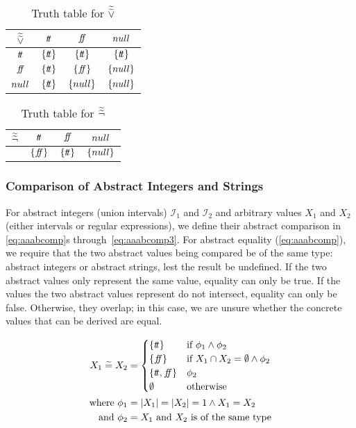 \begin{table}[H]
    \centering
    \caption{Truth table for $\widetilde{\widetilde{\lor}}$}
    \begin{tabular}{c|ccc}
        $\widetilde{\widetilde{\lor}}$ & $t\!t$ & $f\!\!f$ & $null$ \\
        \hline
        $t\!t$ & $\{t\!t\}$ & $\{t\!t\}$ & $\{t\!t\}$ \\
        $f\!\!f$ & $\{t\!t\}$ & $\{f\!\!f\}$ & $\{null\}$ \\
        $null$ & $\{t\!t\}$ & $\{null\}$ & $\{null\}$ \\
    \end{tabular}
    \label{tab:aaablor}
\end{table}

\begin{table}[H]
    \centering
    \caption{Truth table for $\widetilde{\widetilde{\neg}}$}
    \begin{tabular}{c|ccc}
        $\widetilde{\widetilde{\neg}}$ & $t\!t$ & $f\!\!f$ & $null$ \\
        \hline
        & $\{f\!\!f\}$ & $\{t\!t\}$ & $\{null\}$ \\
    \end{tabular}
    \label{tab:aaabneg}
\end{table}

\subsubsection{Comparison of Abstract Integers and Strings}\label{subsubsec:abstract-comparison}
For abstract integers (union intervals) $\mathscr{I}_1$ and $\mathscr{I}_2$ and arbitrary values $X_1$ and $X_2$ (either intervals or regular expressions), we define their abstract comparison in \autoref{eq:aaabcomp}s through~\ref{eq:aaabcomp3}.
For abstract equality (\autoref{eq:aaabcomp}), we require that the two abstract values being compared be of the same type: abstract integers or abstract strings, lest the result be undefined.
If the two abstract values only represent the same value, equality can only be true.
If the values the two abstract values represent do not intersect, equality can only be false.
Otherwise, they overlap; in this case, we are unsure whether the concrete values that can be derived are equal.

\begin{align} \nonumber
    X_1 \;\aab{=}\; X_2 &= \begin{cases}
        \{\true\} & \text{if } \phi_1 \land \phi_2 \\
        \{\false\} & \text{if } X_1 \cap X_2 = \emptyset \land \phi_2 \\
        \{\true, \false\} & \phi_2 \\
        \emptyset & \text{otherwise}
    \end{cases}\\
    \text{where } \phi_1&=|X_1| = |X_2| = 1 \land X_1 = X_2 \nonumber\\
    \text{and } \phi_2&=X_1 \text{ and } X_2 \text{ is of the same type}
    \label{eq:aaabcomp}
\end{align}

